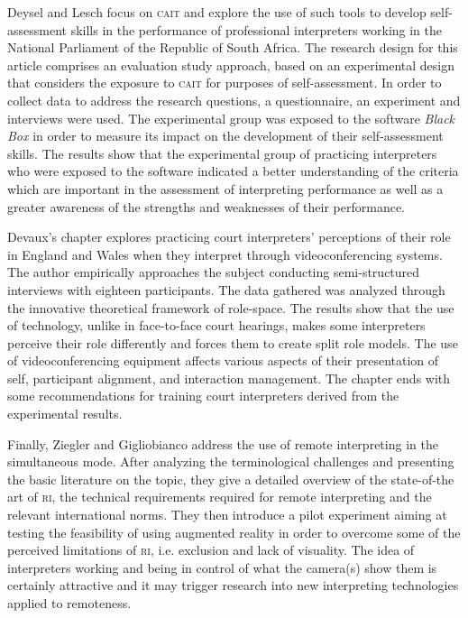 \documentclass[output=paper]{langsci/langscibook}
\begin{document}
Deysel and Lesch focus on \textsc{cait} and explore the use of such tools to develop self-assessment skills in the performance of professional interpreters working in the National Parliament of the Republic of South Africa. The research design for this article comprises an evaluation study approach, based on an experimental design that considers the exposure to \textsc{cait} for purposes of self-assessment. In order to collect data to address the research questions, a questionnaire, an experiment and interviews were used. The experimental group was exposed to the software \textit{Black Box} in order to measure its impact on the development of their self-assessment skills. The results show that the experimental group of practicing interpreters who were exposed to the software indicated a better understanding of the criteria which are important in the assessment of interpreting performance as well as a greater awareness of the strengths and weaknesses of their performance. 
 
Devaux’s chapter explores practicing court interpreters’ perceptions of their role in England and Wales when they interpret through videoconferencing systems. The author empirically approaches the subject conducting semi-structured interviews with eighteen participants. The data gathered was analyzed through the innovative theoretical framework of role-space. The results show that the use of technology, unlike in face-to-face court hearings, makes some interpreters perceive their role differently and forces them to create split role models. The use of videoconferencing equipment affects various aspects of their presentation of self, participant alignment, and interaction management. The chapter ends with some recommendations for training court interpreters derived from the experimental results. 
 
Finally, Ziegler and Gigliobianco address the use of remote interpreting in the simultaneous mode. After analyzing the terminological challenges and presenting the basic literature on the topic, they give a detailed overview of the state-of-the art of \textsc{ri}, the technical requirements required for remote interpreting and the relevant international norms. They then introduce a pilot experiment aiming at testing the feasibility of using augmented reality in order to overcome some of the perceived limitations of \textsc{ri}, i.e. exclusion and lack of visuality. The idea of interpreters working and being in control of what the camera(s) show them is certainly attractive and it may trigger research into new interpreting technologies applied to remoteness. 
 
\end{document}
